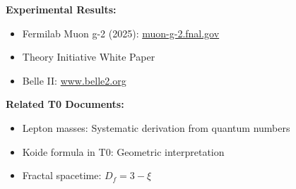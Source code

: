 	\textbf{Experimental Results:}
	\begin{itemize}
		\item Fermilab Muon g-2 (2025): \href{https://muon-g-2.fnal.gov/}{muon-g-2.fnal.gov}
		\item Theory Initiative White Paper
		\item Belle II: \href{https://www.belle2.org/}{www.belle2.org}
	\end{itemize}
	
	\textbf{Related T0 Documents:}
	\begin{itemize}
		\item Lepton masses: Systematic derivation from quantum numbers
		\item Koide formula in T0: Geometric interpretation
		\item Fractal spacetime: $D_f = 3 - \xi$
	\end{itemize}
	